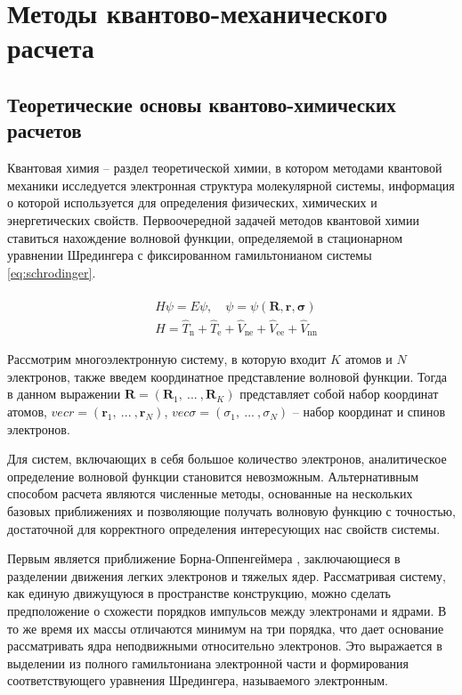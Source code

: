 \documentclass[12pt]{extarticle}
\renewcommand{\vec}{\mathbf}
\begin{document}
    \newpage
    \section{Методы квантово-механического расчета}
   
    \subsection{Теоретические основы квантово-химических расчетов}
    \label{sec:Chapter1.1}
    
    Квантовая химия -- раздел теоретической химии, в котором методами квантовой механики исследуется электронная структура молекулярной системы, информация о которой используется для определения физических, химических и энергетических свойств. Первоочередной задачей методов квантовой химии ставиться нахождение волновой функции, определяемой в стационарном уравнении Шредингера с фиксированном гамильтонианом системы \ref{eq:schrodinger}.
    
    \begin{equation} \label{eq:schrodinger}
    	\begin{split}
    		&\hat{H} \psi = E \psi, \quad \psi = \psi(\vec{R}, \vec{r}, \vec{\sigma} ) \\
    		&\hat{H}=\hat{T}_\text{n}+\hat{T}_\text{e}+\hat{V}_\text{ne}+\hat{V}_\text{ee}+\hat{V}_\text{nn}
    	\end{split}
    \end{equation}
    
    Рассмотрим многоэлектронную систему, в которую входит $K$ атомов и $N$ электронов, также введем координатное представление волновой функции. Тогда в данном выражении $\vec{R} = (\vec{R}_1,\ ...\ , \vec{R}_K)$ представляет собой набор координат атомов, $vec{r} = (\vec{r}_1,\ ...\ , \vec{r}_N)$, $vec{\sigma} = (\sigma_1,\ ...\ , \sigma_N)$ -- набор координат и спинов электронов.
    
    Для систем, включающих в себя большое количество электронов, аналитическое определение волновой функции становится невозможным. Альтернативным способом расчета являются численные методы, основанные на нескольких базовых приближениях и позволяющие получать волновую функцию с точностью, достаточной для корректного определения интересующих нас свойств системы.
    
    Первым является приближение Борна-Оппенгеймера \cite{Jensen-79, Tsirelson-80}, заключающиеся в разделении движения легких электронов и тяжелых ядер. Рассматривая систему, как единую движущуюся в пространстве конструкцию, можно сделать предположение о схожести порядков импульсов между электронами и ядрами. В то же время их массы отличаются минимум на три порядка, что дает основание рассматривать ядра неподвижными относительно электронов. Это выражается в выделении из полного гамильтониана электронной части и формирования соответствующего уравнения Шредингера, называемого электронным. 
    
\end{document}

